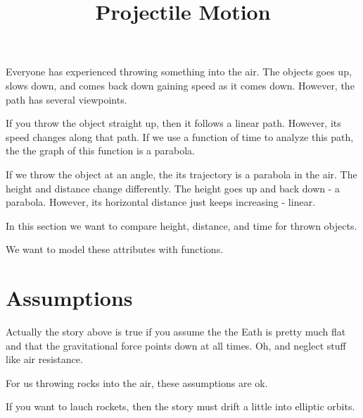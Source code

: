 \documentclass{ximera}
\title{Projectile Motion}
\begin{document}
\begin{abstract}
\end{abstract}
\maketitle



Everyone has experienced throwing something into the air. The objects goes up, slows down, and comes back down gaining speed as it comes down.  However, the path has several viewpoints.

If you throw the object straight up, then it follows a linear path.  However, its speed changes along that path.  If we use a function of time to analyze this path, the the graph of this function is a parabola.

If we throw the object at an angle, the its trajectory is a parabola in the air.  The height and distance change differently.  The height goes up and back down - a parabola.  However, its horizontal distance just keeps increasing - linear.

In this section we want to compare height, distance, and time for thrown objects.

We want to model these attributes with functions.



\section{Assumptions}

Actually the story above is true if you assume the the Eath is pretty much flat and that the gravitational force points down at all times. Oh, and neglect stuff like air resistance.


For us throwing rocks into the air, these assumptions are ok.

If you want to lauch rockets, then the story must drift a little into elliptic orbits.  
\end{document}
